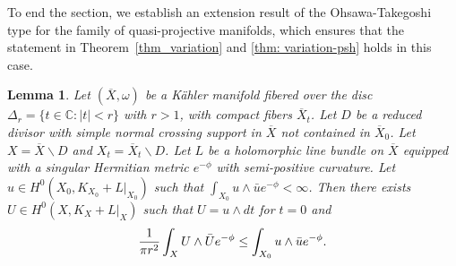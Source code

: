 \documentclass[a4paper, 11pt]{amsart}
\theoremstyle{plain}
\numberwithin{equation}{section} %
\numberwithin{figure}{section} %
\theoremstyle{plain}
\theoremstyle{plain}
\theoremstyle{plain}
\theoremstyle{plain}
\newtheorem{lemma}[theorem]{Lemma} %
\theoremstyle{remark}
\theoremstyle{definition}
\theoremstyle{definition}
\begin{document}
 To end the section, we establish an extension result of the Ohsawa-Takegoshi type for the family of quasi-projective manifolds, which ensures that the statement in Theorem~\ref{thm_variation} and
    \ref{thm: variation-psh} holds in this case.
\begin{lemma}\label{OT-thm-quasi-proj}
Let $(\overline{X},\omega)$ be a K\"ahler manifold fibered over the disc $\Delta_r=\{t\in\mathbb{C}:|t|<r\}$ with $r>1$,  with compact fibers $\overline{X}_t$. 
Let $D$ be a reduced divisor with simple normal crossing support in $\overline{X}$ not contained in $\overline{X}_0$. Let $X=\overline{X}\backslash D$ and  $X_t=\overline{X}_t\backslash D$.
Let $L$ be a holomorphic line bundle on $\overline{X}$ equipped with a singular Hermitian metric $e^{-\phi}$ with semi-positive curvature. Let $u\in H^0(X_0, K_{X_0}+L|_{X_0})$ such that $\int_{X_0}u\wedge\bar ue^{-\phi}<\infty$. Then there exists $U\in H^0(X,K_X+L|_X)$ such that
$U=u\wedge dt$ for $t=0$ and \begin{equation}
    \label{eq: OT-inequ}
 \frac{1}{\pi r^2}\int_{X}U\wedge \Bar{U}e^{-\phi}\leq \int_{X_0}u\wedge \bar ue^{-\phi}.\end{equation}
\end{lemma}
\end{document}
